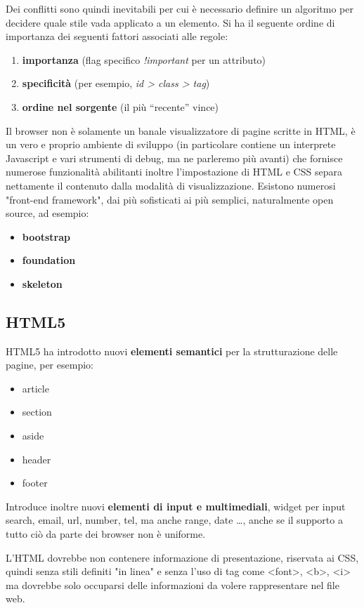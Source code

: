 \documentclass[a4paper,12pt, oneside]{book}
\begin{document}
Dei conflitti sono quindi inevitabili per cui è necessario definire un algoritmo per decidere quale
stile vada applicato a un elemento.\newline
Si ha il seguente ordine di importanza dei seguenti fattori associati alle regole:
\begin{enumerate}
	\item \textbf{importanza} (flag specifico \textit{!important} per un attributo)
	\item \textbf{specificità} (per esempio, \textit{id > class > tag})
	\item \textbf{ordine nel sorgente }(il più “recente” vince)
\end{enumerate}
Il browser non è solamente un banale visualizzatore di pagine scritte in HTML, è un vero e proprio 
ambiente di sviluppo (in particolare contiene un interprete Javascript e vari strumenti di debug,
ma ne parleremo più avanti) che fornisce numerose funzionalità abilitanti inoltre l'impostazione di
HTML e CSS separa nettamente il contenuto dalla modalità di visualizzazione.\newline
Esistono numerosi "front-end framework", dai più sofisticati ai più semplici, naturalmente open source, ad esempio:
\begin{itemize}
	\item \textbf{bootstrap}
	\item \textbf{foundation}
	\item \textbf{skeleton}
\end{itemize}

\subsection{HTML5}
HTML5 ha introdotto nuovi \textbf{elementi semantici} per la strutturazione delle pagine, per esempio:
\begin{itemize}
	\item article
	\item section
	\item aside
	\item header
	\item footer
\end{itemize}
Introduce inoltre nuovi \textbf{elementi di input e multimediali}, widget per input search, email,
url, number, tel, ma anche range, date \dots,  anche se il supporto a tutto ciò da parte dei browser non è uniforme.

L’HTML dovrebbe non contenere informazione di presentazione, riservata ai CSS, 
quindi senza stili definiti "in linea" e senza l'uso di tag come <font>, <b>, <i> ma dovrebbe solo 
occuparsi delle informazioni da volere rappresentare nel file web.
\end{document}
